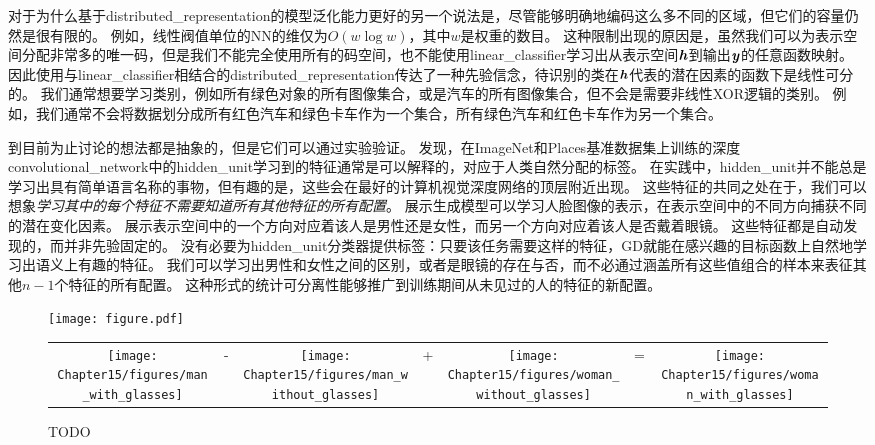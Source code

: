 对于为什么基于\gls{distributed_representation}的模型泛化能力更好的另一个说法是，尽管能够明确地编码这么多不同的区域，但它们的容量仍然是很有限的。
例如，线性阀值单位的\gls{NN}的维仅为$O(w\log w)$，其中$w$是权重的数目\citep{sontag1998vc}。
这种限制出现的原因是，虽然我们可以为表示空间分配非常多的唯一码，但是我们不能完全使用所有的码空间，也不能使用\gls{linear_classifier}学习出从表示空间$\boldsymbol{\mathit{h}}$到输出$\boldsymbol{\mathit{y}}$的任意函数映射。
因此使用与\gls{linear_classifier}相结合的\gls{distributed_representation}传达了一种先验信念，待识别的类在$\boldsymbol{\mathit{h}}$代表的潜在因素的函数下是线性可分的。
我们通常想要学习类别，例如所有绿色对象的所有图像集合，或是汽车的所有图像集合，但不会是需要非线性XOR逻辑的类别。
例如，我们通常不会将数据划分成所有红色汽车和绿色卡车作为一个集合，所有绿色汽车和红色卡车作为另一个集合。


到目前为止讨论的想法都是抽象的，但是它们可以通过实验验证。
\cite{Zhou-et-al-ICLR2015}发现，在ImageNet和Places基准数据集上训练的深度\gls{convolutional_network}中的\gls{hidden_unit}学习到的特征通常是可以解释的，对应于人类自然分配的标签。
在实践中，\gls{hidden_unit}并不能总是学习出具有简单语言名称的事物，但有趣的是，这些会在最好的计算机视觉深度网络的顶层附近出现。
这些特征的共同之处在于，我们可以想象\emph{学习其中的每个特征不需要知道所有其他特征的所有配置}。
\cite{radford2015unsupervised}展示生成模型可以学习人脸图像的表示，在表示空间中的不同方向捕获不同的潜在变化因素。
展示表示空间中的一个方向对应着该人是男性还是女性，而另一个方向对应着该人是否戴着眼镜。
这些特征都是自动发现的，而并非先验固定的。
没有必要为\gls{hidden_unit}分类器提供标签：只要该任务需要这样的特征，\gls{GD}就能在感兴趣的目标函数上自然地学习出语义上有趣的特征。
我们可以学习出男性和女性之间的区别，或者是眼镜的存在与否，而不必通过涵盖所有这些值组合的样本来表征其他$n-1$个特征的所有配置。
这种形式的统计可分离性能够推广到训练期间从未见过的人的特征的新配置。

\begin{figure}[!htb]
\ifOpenSource
\centerline{\texttt{[image: figure.pdf]}}
\else
\begin{tabular}{ccccccc}
\texttt{[image: Chapter15/figures/man\_with\_glasses]} &
- &
\texttt{[image: Chapter15/figures/man\_without\_glasses]} &
+ &
\texttt{[image: Chapter15/figures/woman\_without\_glasses]} &
= &
\texttt{[image: Chapter15/figures/woman\_with\_glasses]}
\end{tabular}
\fi
\caption{TODO}
\label{fig:chap15_generative_glasses}
\end{figure}


